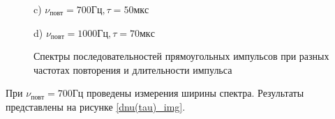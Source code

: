 \documentclass[a4paper,12pt]{article} %
\begin{document}
\begin{figure}[h!]
\begin{minipage}[h!]{0.47\linewidth}
\end{minipage}
\vfill
\begin{minipage}[h!]{0.47\linewidth}
 c) $\nu_{повт} = 700 Гц, \tau = 50 мкс$ \\
\end{minipage}
\hfill
\begin{minipage}[h!]{0.47\linewidth}
 d) $\nu_{повт} = 1000 Гц, \tau = 70 мкс$ \\
\end{minipage}
\caption{Спектры последовательностей прямоугольных импульсов при разных частотах повторения и длительности импульса}
\label{прямоуг}
\end{figure}
При $\nu_{повт} = 700 Гц$ проведены измерения ширины спектра. Результаты 
представлены на рисунке \ref{dnu(tau)_img}.
\end{document}
